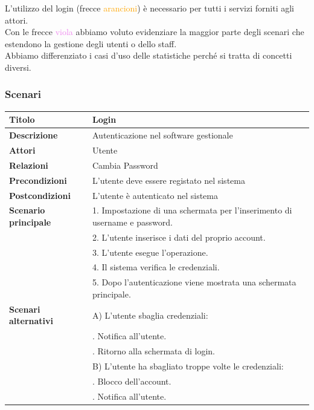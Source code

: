 \documentclass[a4paper]{article}
\begin{document}
L'utilizzo del login (frecce \textcolor{orange}{arancioni}) è necessario per tutti i servizi forniti agli attori.\\Con le frecce \textcolor{violet}{viola} abbiamo voluto evidenziare la maggior parte degli scenari che estendono la gestione degli utenti o dello staff.\\Abbiamo differenziato i casi d'uso delle statistiche perché si tratta di concetti diversi.    

\newpage

\subsubsection{Scenari}


\begin{center}
\begin{tabularx}{1\textwidth}{|l|X|}
    \hline
	\textbf{Titolo} & Login \\
	\hline
	\textbf{Descrizione} & Autenticazione nel software gestionale \\
	\hline
	\textbf{Attori} & Utente \\
	\hline
	\textbf{Relazioni} & Cambia Password \\
	\hline
	\textbf{Precondizioni} & L'utente deve essere registato nel sistema \\
	\hline
	\textbf{Postcondizioni} & L'utente è autenticato nel sistema \\
	\hline
	\textbf{Scenario principale} & 1. Impostazione di una schermata per l'inserimento di username e password. \\
								 & 2. L'utente inserisce i dati del proprio account. \\
								 & 3. L'utente esegue l'operazione. \\
								 & 4. Il sistema verifica le credenziali. \\
								 & 5. Dopo l'autenticazione viene mostrata una schermata principale.\\
	\hline
	\textbf{Scenari alternativi} & A) L'utente sbaglia credenziali: \\
								 & \quad 1. Notifica all'utente.\\
								 & \quad 2. Ritorno alla schermata di login.\\
								 & B) L'utente ha sbagliato troppe volte le credenziali: \\
								 & \quad 1. Blocco dell'account.\\
								 & \quad 2. Notifica all'utente.\\

\end{tabularx}
\end{center}
\end{document}
